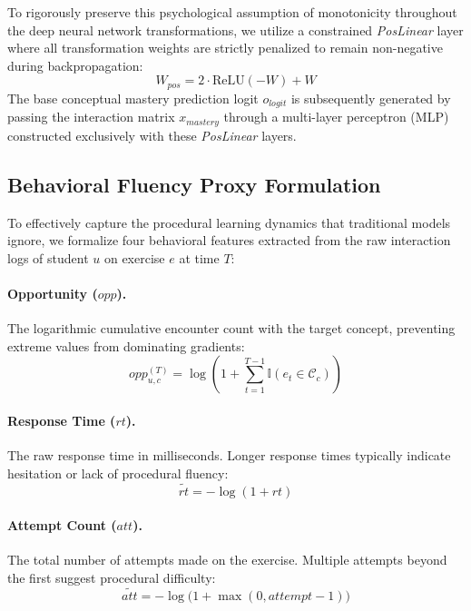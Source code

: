 \documentclass[runningheads]{llncs}
\begin{document}
To rigorously preserve this psychological assumption of monotonicity throughout the deep neural network transformations, we utilize a constrained \textit{PosLinear} layer where all transformation weights are strictly penalized to remain non-negative during backpropagation:
\begin{equation}
    W_{pos} = 2 \cdot \text{ReLU}(-W) + W
\end{equation}
The base conceptual mastery prediction logit $o_{logit}$ is subsequently generated by passing the interaction matrix $x_{mastery}$ through a multi-layer perceptron (MLP) constructed exclusively with these \textit{PosLinear} layers.

\subsection{Behavioral Fluency Proxy Formulation}
To effectively capture the procedural learning dynamics that traditional models ignore, we formalize four behavioral features extracted from the raw interaction logs of student $u$ on exercise $e$ at time $T$:

\paragraph{Opportunity ($opp$).} The logarithmic cumulative encounter count with the target concept, preventing extreme values from dominating gradients:
\begin{equation}
    opp_{u, c}^{(T)} = \log \left( 1 + \sum_{t=1}^{T-1} \mathbb{I}(e_t \in \mathcal{C}_c) \right)
\end{equation}

\paragraph{Response Time ($rt$).} The raw response time in milliseconds. Longer response times typically indicate hesitation or lack of procedural fluency:
\begin{equation}
    \widetilde{rt} = -\log(1 + rt)
\end{equation}

\paragraph{Attempt Count ($att$).} The total number of attempts made on the exercise. Multiple attempts beyond the first suggest procedural difficulty:
\begin{equation}
    \widetilde{att} = -\log\bigl(1 + \max(0, attempt - 1)\bigr)
\end{equation}
\end{document}

